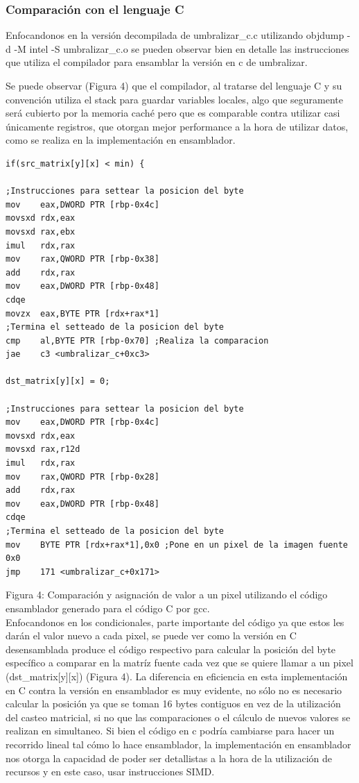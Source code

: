 \subsubsection{Comparación con el lenguaje C}
Enfocandonos en la versión decompilada de umbralizar\_c.c utilizando objdump -d -M intel -S umbralizar\_c.o se pueden observar bien en detalle las instrucciones que utiliza el compilador para ensamblar la versión en c de umbralizar.

Se puede observar (Figura 4) que el compilador, al tratarse del lenguaje C y su convención utiliza el stack para guardar variables locales, algo que seguramente será cubierto por la memoria caché pero que es comparable contra utilizar casi únicamente registros, que otorgan mejor performance a la hora de utilizar datos, como se realiza en la implementación en ensamblador.
\begin{lstlisting}
if(src_matrix[y][x] < min) {

;Instrucciones para settear la posicion del byte
mov    eax,DWORD PTR [rbp-0x4c]
movsxd rdx,eax
movsxd rax,ebx
imul   rdx,rax
mov    rax,QWORD PTR [rbp-0x38]
add    rdx,rax
mov    eax,DWORD PTR [rbp-0x48]
cdqe   
movzx  eax,BYTE PTR [rdx+rax*1]
;Termina el setteado de la posicion del byte
cmp    al,BYTE PTR [rbp-0x70] ;Realiza la comparacion
jae    c3 <umbralizar_c+0xc3>

dst_matrix[y][x] = 0;

;Instrucciones para settear la posicion del byte
mov    eax,DWORD PTR [rbp-0x4c]
movsxd rdx,eax
movsxd rax,r12d
imul   rdx,rax
mov    rax,QWORD PTR [rbp-0x28]
add    rdx,rax
mov    eax,DWORD PTR [rbp-0x48]
cdqe   
;Termina el setteado de la posicion del byte
mov    BYTE PTR [rdx+rax*1],0x0 ;Pone en un pixel de la imagen fuente 0x0
jmp    171 <umbralizar_c+0x171>
\end{lstlisting}

Figura 4: Comparación y asignación de valor a un pixel utilizando el código  ensamblador generado para el código C por gcc. \\

Enfocandonos en los condicionales, parte importante del código ya que estos les darán el valor nuevo a cada pixel, se puede ver como la versión en C desensamblada produce el código respectivo para calcular la posición del byte específico a comparar en la matríz fuente cada vez que se quiere llamar a un pixel (dst\_matrix[y][x]) (Figura 4). La diferencia en eficiencia en esta implementación en C contra la versión en ensamblador es muy evidente, no sólo no es necesario calcular la posición ya que se toman 16 bytes contiguos en vez de la utilización del casteo matricial, si no que las comparaciones o el cálculo de nuevos valores se realizan en simultaneo. Si bien el código en c podría cambiarse para hacer un recorrido lineal tal cómo lo hace ensamblador, la implementación en ensamblador nos otorga la capacidad de poder ser detallistas a la hora de la utilización de recursos y en este caso, usar instrucciones SIMD.

